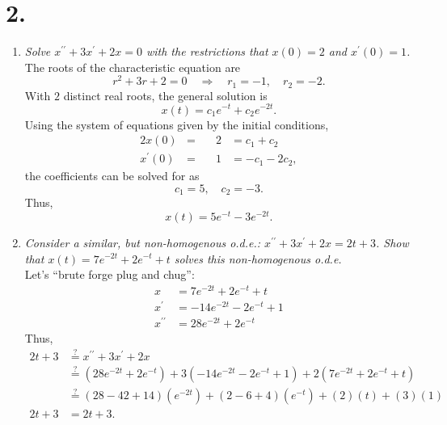 \documentclass[12pt]{article}
\begin{document}
\section*{2.}
\begin{enumerate}[label=(\alph*)]
	\item \textit{Solve
	$x^{\prime\prime} + 3x^\prime + 2x = 0$ with the restrictions that
	$x(0) = 2$ and $x^\prime(0) = 1$.}\\[\baselineskip]
	The roots of the characteristic equation are
	\begin{equation*}
		r^2 + 3r + 2 = 0 \quad \Rightarrow \quad r_1 = -1, \quad r_2 = -2.
	\end{equation*}
	With $2$ distinct real roots, the general solution is
	\begin{equation*}
		x(t) = c_1 e^{-t} + c_2 e^{-2 t}.
	\end{equation*}
	Using the system of equations given by the initial conditions,
	\begin{alignat*}{2}
		x(0) &=& \quad 2 &= c_1 + c_2 \\
		x^\prime(0) &=& \quad 1 &= -c_1 - 2 c_2,
	\end{alignat*}
	the coefficients can be solved for as
	\begin{equation*}
		c_1 = 5, \quad
		c_2 = -3.
	\end{equation*}
	Thus,
	\begin{equation*}
		\boxed{
			x(t) = 5 e^{-t} - 3 e^{-2 t}
		}.
	\end{equation*}
	
	\item \textit{Consider a similar, but non-homogenous o.d.e.:
	$x^{\prime\prime} + 3x^\prime + 2x = 2t + 3$. Show that
	$x(t) = 7e^{-2t} + 2e^{-t} + t$ solves this non-homogenous o.d.e.}
	\\[\baselineskip]
	Let's ``brute forge plug and chug'':
	\begin{align*}
		x &= 7e^{-2t} + 2e^{-t} + t \\
		x^\prime &= -14e^{-2t} - 2e^{-t} + 1 \\
		x^{\prime\prime} &= 28e^{-2t} + 2e^{-t}
	\end{align*}
	Thus,
	\begin{align*}
		2t + 3 &\overset{?}{=} x^{\prime\prime} + 3x^\prime + 2x
		\\ &\overset{?}{=}
		(28e^{-2t} + 2e^{-t})
		+ 3(-14e^{-2t} - 2e^{-t} + 1)
		+ 2(7e^{-2t} + 2e^{-t} + t)
		\\ &\overset{?}{=}
		(28 - 42 + 14)(e^{-2t})
		+ (2 - 6 + 4)(e^{-t})
		+ (2)(t) + (3)(1)
		\\
		2t + 3 &= 2t + 3.
	\end{align*}
\end{enumerate}
\newpage
\end{document}
